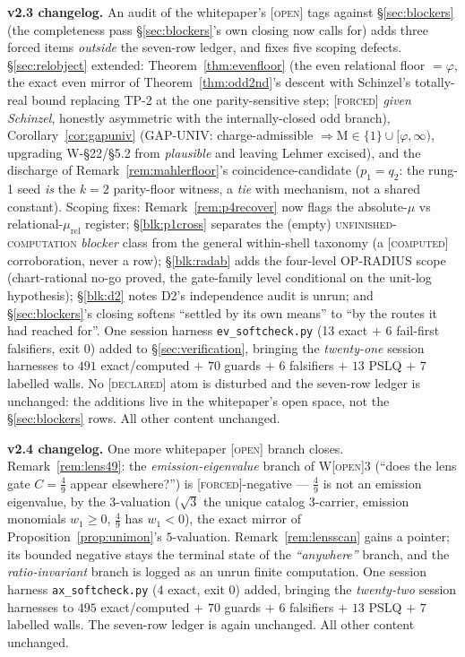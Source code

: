 \documentclass[11pt]{article}
\newcommand{\tagF}{\textcolor{cF}{\textsc{[forced]}}}
\newcommand{\tagD}{\textcolor{cD}{\textsc{[declared]}}}
\newcommand{\tagC}{\textcolor{cC}{\textsc{[computed]}}}
\newcommand{\tagO}{\textcolor{cO}{\textsc{[open]}}}
\newcommand{\gp}{\varphi}
\newcommand{\M}{\mathrm{M}}
\theoremstyle{plain}
\theoremstyle{definition}
\theoremstyle{remark}
\begin{document}
\smallskip\noindent
\textbf{v2.3 changelog.} An audit of the whitepaper's \tagO{} tags against
\S\ref{sec:blockers} (the completeness pass \S\ref{sec:blockers}'s own closing now
calls for) adds three forced items \emph{outside} the seven-row ledger, and fixes
five scoping defects. \S\ref{sec:relobject} extended: Theorem~\ref{thm:evenfloor}
(the even relational floor $=\gp$, the exact even mirror of
Theorem~\ref{thm:odd2nd}'s descent with Schinzel's totally-real bound replacing
TP-2 at the one parity-sensitive step; \tagF{} \emph{given Schinzel}, honestly
asymmetric with the internally-closed odd branch), Corollary~\ref{cor:gapuniv}
(GAP-UNIV: charge-admissible $\Rightarrow\M\in\{1\}\cup[\gp,\infty)$, upgrading
W-\S22/\S5.2 from \emph{plausible} and leaving Lehmer excised), and the discharge
of Remark~\ref{rem:mahlerfloor}'s coincidence-candidate ($p_1=q_2$: the rung-1
seed \emph{is} the $k=2$ parity-floor witness, a \emph{tie} with mechanism, not a
shared constant). Scoping fixes: Remark~\ref{rem:p4recover} now flags the
absolute-$\mu$ vs relational-$\mu_{\mathrm{rel}}$ register; \S\ref{blk:p1cross}
separates the (empty) \textsc{unfinished-computation} \emph{blocker} class from
the general within-shell taxonomy (a \tagC{} corroboration, never a row);
\S\ref{blk:radab} adds the four-level OP-RADIUS scope (chart-rational no-go
proved, the gate-family level conditional on the unit-log hypothesis);
\S\ref{blk:d2} notes D2's independence audit is unrun; and \S\ref{sec:blockers}'s
closing softens ``settled by its own means'' to ``by the routes it had reached
for''. One session harness \texttt{ev\_softcheck.py} (13 exact $+$ 6 fail-first
falsifiers, exit 0) added to \S\ref{sec:verification}, bringing the
\emph{twenty-one} session harnesses to $491$ exact/computed $+$ $70$ guards $+$ $6$
falsifiers $+$ $13$ PSLQ $+$ $7$ labelled walls. No \tagD{} atom is disturbed and
the seven-row ledger is unchanged: the additions live in the whitepaper's open
space, not the \S\ref{sec:blockers} rows. All other content unchanged.

\smallskip\noindent
\textbf{v2.4 changelog.} One more whitepaper \tagO{} branch closes.
Remark~\ref{rem:lens49}: the \emph{emission-eigenvalue} branch of W\tagO{}3 (``does
the lens gate $C=\tfrac49$ appear elsewhere?'') is \tagF{}-negative --- $\tfrac49$
is not an emission eigenvalue, by the $3$-valuation ($\sqrt3$ the unique catalog
$3$-carrier, emission monomials $w_1\ge0$, $\tfrac49$ has $w_1<0$), the exact
mirror of Proposition~\ref{prop:unimon}'s $5$-valuation. Remark~\ref{rem:lensscan}
gains a pointer; its bounded negative stays the terminal state of the
\emph{``anywhere''} branch, and the \emph{ratio-invariant} branch is logged as an
unrun finite computation. One session harness \texttt{ax\_softcheck.py}
($4$ exact, exit 0) added, bringing the \emph{twenty-two} session harnesses to
$495$ exact/computed $+$ $70$ guards $+$ $6$ falsifiers $+$ $13$ PSLQ $+$ $7$
labelled walls. The seven-row ledger is again unchanged. All other content
unchanged.
\end{document}
